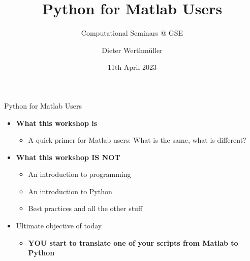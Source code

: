 \documentclass[usepdftitle=false, aspectratio=169]{beamer}
\title{Python for Matlab Users}
\subtitle{Computational Seminars @ GSE}
\date{11th April 2023}
\author{Dieter Werthmüller}
\institute{\dra\href{https://github.com/prisae/Python4MatlabUsers}{github.com/prisae/Python4MatlabUsers}}
\newcommand{\ato}{\addtocounter{framenumber}{1}}
\begin{document}

\ato %
\maketitle




\begin{frame}
  {Python for Matlab Users}

  \begin{itemize}\itemsep .6cm
    \item \textbf{What this workshop is}
      \begin{itemize}
        \item A quick primer for Matlab users: What is the same, what is different?
      \end{itemize}
    \item \textbf{What this workshop IS NOT}
      \begin{itemize}
        \item An introduction to programming
        \item An introduction to Python
        \item Best practices and all the other stuff
      \end{itemize}
    \item Ultimate objective of today
      \begin{itemize}
        \item \textbf{YOU start to translate one of your scripts from Matlab to
          Python}
      \end{itemize}
  \end{itemize}
\end{frame}
\end{document}
